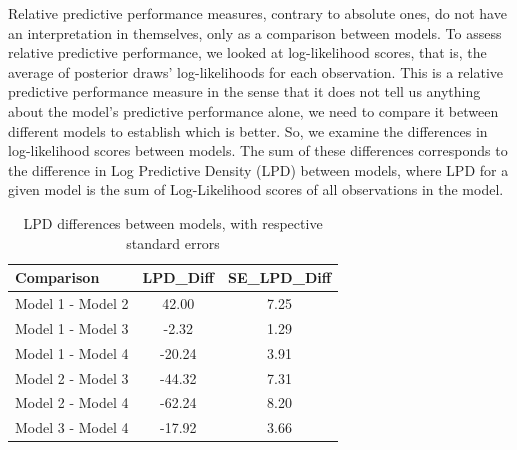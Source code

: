 \documentclass[12pt]{article}
\newcommand{\red}[1]{\textcolor{red}{#1}}
\newcommand{\blue}[1]{\textcolor{blue}{#1}}
\begin{document}
%
%






Relative predictive performance measures, contrary to absolute ones, do not have an interpretation in themselves, only as a comparison between models. 
To assess relative predictive performance, we looked at log-likelihood scores, that is, the average of posterior draws' log-likelihoods for each observation.
This is a relative predictive performance measure in the sense that it does not tell us anything about the model's predictive performance alone, we need to compare it between different models to establish which is better. So, we examine the differences in log-likelihood scores between models.
The sum of these differences corresponds to the difference in Log Predictive Density (LPD) between models, where LPD for a given model is the sum of Log-Likelihood scores of all observations in the model.




\begin{table}[ht]
	\centering
	\begin{tabular}{lcc}
		\hline
		       Comparison & LPD\_Diff & SE\_LPD\_Diff \\ 
		       \midrule
		Model 1 - Model 2 &     42.00 &          7.25 \\
		Model 1 - Model 3 &     -2.32 &          1.29 \\
		Model 1 - Model 4 &    -20.24 &          3.91 \\
		Model 2 - Model 3 &    -44.32 &          7.31 \\
		Model 2 - Model 4 &    -62.24 &          8.20 \\
		Model 3 - Model 4 &    -17.92 &          3.66 \\ \hline
	\end{tabular}
	\caption{LPD differences between models, with respective standard errors}
	\label{tab:LPD_diff}
\end{table}
\end{document}
